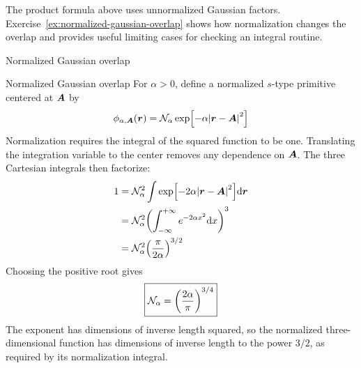 The product formula above uses unnormalized Gaussian factors.
Exercise~\ref{ex:normalized-gaussian-overlap} shows how normalization changes the overlap and provides useful
limiting cases for checking an integral routine.

\begin{hfexercise}[phantom={\label{ex:normalized-gaussian-overlap}}]{Normalized Gaussian overlap}
\end{hfexercise}
\begin{hfsolution}{Normalized Gaussian overlap}
For $\alpha>0$, define a normalized $s$-type primitive centered at $\boldsymbol{A}$ by
\begin{equation}
  \phi_{\alpha,\boldsymbol{A}}(\boldsymbol{r})
  =\mathcal{N}_\alpha\exp[-\alpha\abs{\boldsymbol{r}-\boldsymbol{A}}^2]
\end{equation}
Normalization requires the integral of the squared function to be one.
Translating the integration variable to the center removes any dependence
on $\boldsymbol{A}$. The three Cartesian integrals then factorize:
\begin{equation}
\begin{split}
  1
  &=\mathcal{N}_\alpha^2
    \int\exp[-2\alpha\abs{\boldsymbol{r}-\boldsymbol{A}}^2]\dd\boldsymbol{r}\\
  &=\mathcal{N}_\alpha^2
    \qty(\int_{-\infty}^{+\infty}e^{-2\alpha x^2}\dd x)^3\\
  &=\mathcal{N}_\alpha^2\qty(\frac{\pi}{2\alpha})^{3/2}
\end{split}
\end{equation}
Choosing the positive root gives
\begin{equation}
  \boxed{\mathcal{N}_\alpha=\qty(\frac{2\alpha}{\pi})^{3/4}}
\end{equation}
The exponent has dimensions of inverse length squared, so the normalized
three-dimensional function has dimensions of inverse length to the power
$3/2$, as required by its normalization integral.


\end{hfsolution}

